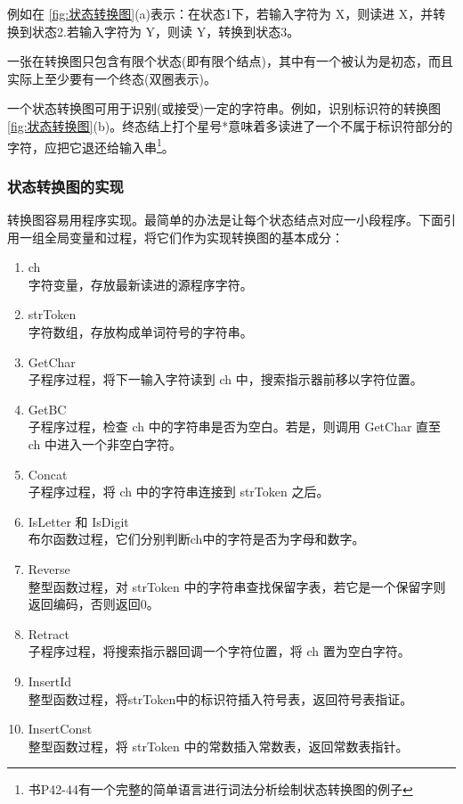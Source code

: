 例如在 \ref{fig:状态转换图}(a)表示：在状态1下，若输入字符为 X，则读进 X，并转换到状态2.若输入字符为 Y，则读 Y，转换到状态3。

一张在转换图只包含\textcolor{tip}{有限个状态(即有限个结点)，其中有一个被认为是初态，而且实际上至少要有一个终态(双圈表示)。}

一个状态转换图可用于识别(或接受)一定的字符串。例如，识别标识符的转换图 \ref{fig:状态转换图}(b)。\textcolor{tip}{终态结上打个星号*意味着多读进了一个不属于标识符部分的字符，应把它退还给输入串\footnote{书P42-44有一个完整的简单语言进行词法分析绘制状态转换图的例子}。}

\subsubsection{状态转换图的实现}

转换图容易用程序实现。最简单的办法是让每个状态结点对应一小段程序。下面引用一组全局变量和过程，将它们作为实现转换图的基本成分：

\begin{enumerate}
    \item ch \\
    字符变量，存放最新读进的源程序字符。
    \item strToken \\
    字符数组，存放构成单词符号的字符串。
    \item  GetChar \\
    子程序过程，将下一输入字符读到 ch 中，搜索指示器前移以字符位置。
    \item GetBC \\
    子程序过程，检查 ch 中的字符串是否为空白。若是，则调用 GetChar 直至 ch 中进入一个非空白字符。
    \item Concat \\
    子程序过程，将 ch 中的字符串连接到 strToken 之后。
    \item IsLetter 和 IsDigit \\
    布尔函数过程，它们分别判断ch中的字符是否为字母和数字。
    \item Reverse \\
    整型函数过程，对 strToken 中的字符串查找保留字表，若它是一个保留字则返回编码，否则返回0。
    \item Retract \\
    子程序过程，将搜索指示器回调一个字符位置，将 ch 置为空白字符。
    \item InsertId \\
    整型函数过程，将strToken中的标识符插入符号表，返回符号表指证。
    \item InsertConst \\
    整型函数过程，将 strToken 中的常数插入常数表，返回常数表指针。
\end{enumerate}

